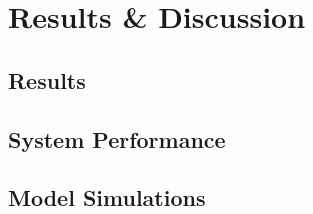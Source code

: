 \section{Results & Discussion}
\subsection{Results}
%
%
\label{Discussion}
%
%
%
\subsection{System Performance}
%
%
\subsection{Model Simulations}
%
